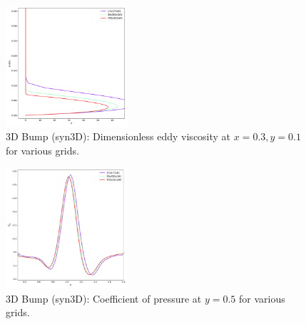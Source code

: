 \begin{figure}[ht!]
    \centering
    \includegraphics[width=0.4\textwidth]{figs/3dbump/x03y01REV_study.pdf}
    \caption{3D Bump (syn3D): Dimensionless eddy viscosity at $x=0.3,y=0.1$ for various grids.}
    \label{fig:syn3dbumpmutstudy}
\end{figure}

\begin{figure}[ht!]
    \centering
    \includegraphics[width=0.4\textwidth]{figs/3dbump/cop050study.pdf}
    \caption{3D Bump (syn3D): Coefficient of pressure at $y=0.5$ for various grids.}
    \label{fig:syn3dbumpcpstudy}
\end{figure}